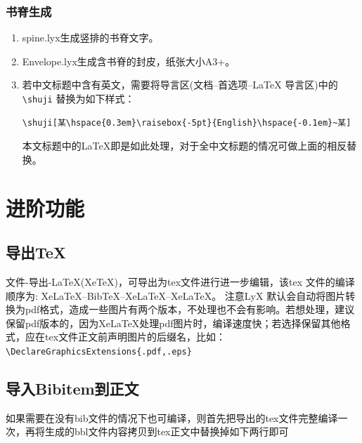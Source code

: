 \documentclass[twoside,longtitle]{LZUthesis}
\begin{document}
\subsection{书脊生成}
\begin{enumerate}
\item spine.lyx生成竖排的书脊文字。
\item Envelope.lyx生成含书脊的封皮，纸张大小A3+。
\item 若中文标题中含有英文，需要将导言区(文档--首选项--\LaTeX{} 导言区)中的\lstinline!\shuji! 替换为如下样式：\footnotesize
\begin{lstlisting}
\shuji[某\hspace{0.3em}\raisebox{-5pt}{English}\hspace{-0.1em}~某]
\end{lstlisting}
\normalsize 本文标题中的\LaTeX{}即是如此处理，对于全中文标题的情况可做上面的相反替换。
\end{enumerate}

\chapter{进阶功能}


\section{导出\protect\TeX{}\label{sec:export}}

文件-导出-\LaTeX{}(Xe\TeX{})，可导出为tex文件进行进一步编辑，该tex 文件的编译顺序为: Xe\LaTeX{}--Bib\TeX{}--Xe\LaTeX{}--Xe\LaTeX{}。 注意LyX 默认会自动将图片转换为pdf格式，造成一些图片有两个版本，不处理也不会有影响。若想处理，建议保留pdf版本的，因为Xe\LaTeX{}处理pdf图片时，编译速度快；若选择保留其他格式，应在tex文件正文前声明图片的后缀名，比如：\lstinline!\DeclareGraphicsExtensions{.pdf,.eps}!


\section{导入Bibitem到正文}

如果需要在没有bib文件的情况下也可编译，则首先把导出的tex文件完整编译一次，再将生成的bbl文件内容拷贝到tex正文中替换掉如下两行即可

\end{document}
